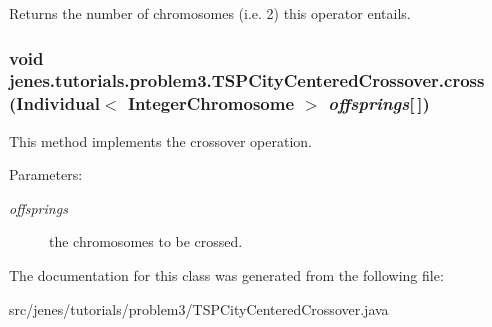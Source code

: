 Returns the number of chromosomes (i.e. 2) this operator entails. \hypertarget{classjenes_1_1tutorials_1_1problem3_1_1_t_s_p_city_centered_crossover_eb7cb2d42aeeea2cb008f98d63b64805}{
\subsubsection[cross]{\setlength{\rightskip}{0pt plus 5cm}void jenes.tutorials.problem3.TSPCityCenteredCrossover.cross (Individual$<$ {\bf IntegerChromosome} $>$ {\em offsprings}\mbox{[}$\,$\mbox{]})}}
\label{classjenes_1_1tutorials_1_1problem3_1_1_t_s_p_city_centered_crossover_eb7cb2d42aeeea2cb008f98d63b64805}


This method implements the crossover operation.

\begin{Desc}
\item[Parameters:]
\begin{description}
\item[{\em offsprings}]the chromosomes to be crossed. \end{description}
\end{Desc}


The documentation for this class was generated from the following file:\begin{CompactItemize}
\item 
src/jenes/tutorials/problem3/TSPCityCenteredCrossover.java\end{CompactItemize}

